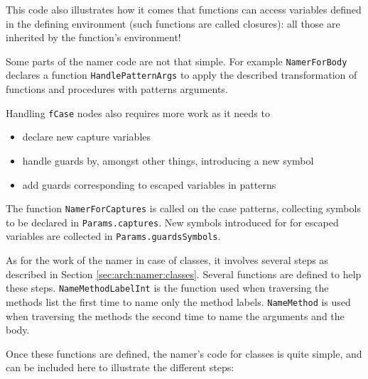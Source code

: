 \documentclass[a4paper]{memoir}
\begin{document}
This code also illustrates how it comes that functions can access variables defined in the defining environment (such functions are called closures): all those are inherited by the function's environment!

Some parts of the namer code are not that simple. For example \lstinline!NamerForBody! 
declares a function \lstinline!HandlePatternArgs!
to apply the described transformation of functions and procedures with patterns
arguments. 

Handling \lstinline!fCase! nodes also requires more work as it needs to 
\begin{itemize}
  \item declare new capture variables
  \item handle guards by, amongst other things, introducing a new symbol
  \item add guards corresponding to escaped variables in patterns
\end{itemize}
The function \lstinline!NamerForCaptures! is called on the case patterns, collecting symbols
to be declared in \lstinline!Params.captures!.
New symbols introduced for for escaped variables are collected in
\lstinline!Params.guardsSymbols!. 

As for the work of the namer in case of classes, it involves several steps as described
in Section \ref{sec:arch:namer:classes}.
Several functions are defined to help these steps. \lstinline!NameMethodLabelInt!
is the function used when traversing the methods list the first time to name
only the method labels.
\lstinline!NameMethod! is used when traversing the methods the second time to
name the arguments and the body.

Once these functions are defined, the namer's code for classes is quite simple,
and can be included here to illustrate the different steps:
\end{document}
